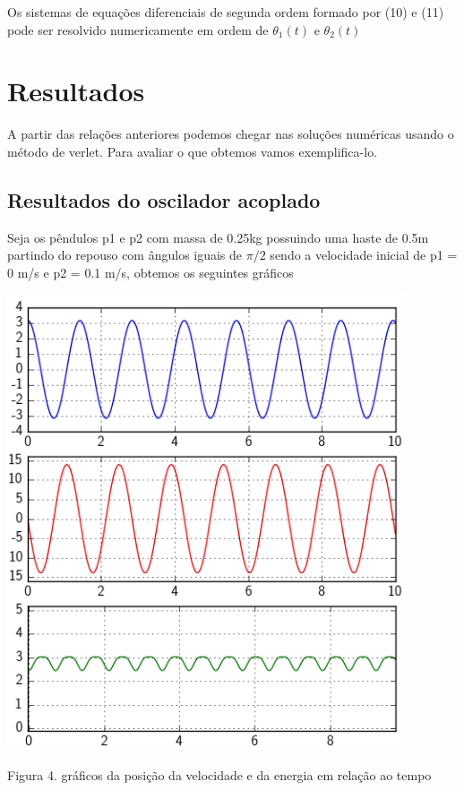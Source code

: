 \documentclass[a4paper]{article} %
\begin{document}
Os sistemas de equa\c{c}\~{o}es diferenciais de segunda ordem formado por (10) e (11) pode ser resolvido numericamente em ordem de $\theta_1(t)$ e $\theta_2(t)$

\section{Resultados}

A partir das relações anteriores podemos chegar nas solu\c{c}\~{o}es num\'{e}ricas usando o método de verlet. Para avaliar o que obtemos vamos exemplifica-lo.

\subsection{Resultados do oscilador acoplado}

Seja os pêndulos p1 e p2 com massa de 0.25kg possuindo uma haste de 0.5m partindo do repouso com ângulos iguais de $\pi/2$ sendo a velocidade inicial de p1 = 0 m/s e p2 = 0.1 m/s, obtemos os seguintes gráficos 
\vspace{0.5cm}
\begin{center}
	\includegraphics[width=4.65in,height=5.30in, keepaspectratio=true]{pendulo_acoplado.PNG}
	
	\scriptsize{Figura 4. gráficos da posição da velocidade e da energia em relação ao tempo}
\end{center}
\end{document}
